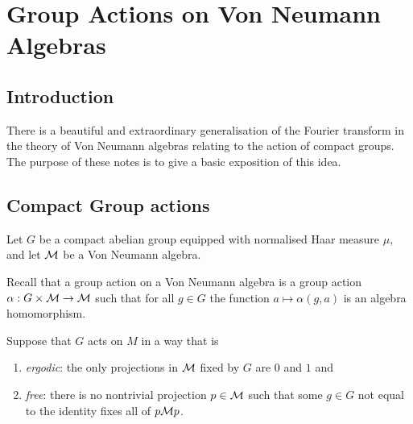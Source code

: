 
\chapter{Group Actions on Von Neumann Algebras} %

\label{GroupActions} %



\section{Introduction}
There is a beautiful and extraordinary generalisation of the Fourier
transform in the theory of Von Neumann algebras relating
to the action of compact groups. The purpose
of these notes is to give a basic exposition of this idea.

\section{Compact Group actions}
Let $G$ be a compact abelian group equipped with normalised Haar
measure $\mu$, and let $\mathcal{M}$ be a Von Neumann algebra.

Recall that a group action on a Von Neumann algebra
is a group action $\alpha:G\times \mathcal{M}\rightarrow \mathcal{M}$ such that
for all $g \in G$ the function $a\mapsto \alpha(g,a)$ is an algebra
homomorphism.

Suppose that $G$ acts on $M$ in a way that is
\begin{enumerate}
    \item{} \emph{ergodic}: the only projections in $\mathcal{M}$
    fixed by $G$ are $0$ and $1$ and
    \item{} \emph{free}: there is no nontrivial projection $p \in \mathcal{M}$
    such that some $g \in G$ not equal to the identity fixes all of $p\mathcal{M} p$.
\end{enumerate}

